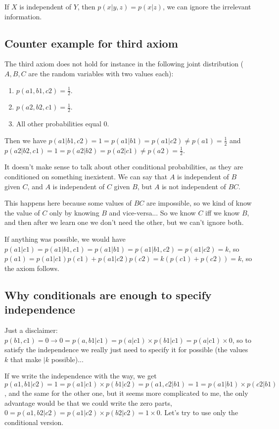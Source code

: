 If $X$ is independent of $Y$, then $p(x|y,z) = p(x|z)$, we can ignore the irrelevant information.

\subsection{Counter example for third axiom}

The third axiom does not hold for instance in the following joint distribution ($A,B,C$ are the random variables with two values each):

\begin{enumerate}
    \item $p(a1,b1,c2) = \frac{1}{2}$.
    \item $p(a2,b2,c1) = \frac{1}{2}$.
    \item All other probabilities equal $0$.
\end{enumerate}

Then we have $p(a1|b1,c2) = 1 = p(a1|b1) = p(a1|c2) \neq p(a1) = \frac{1}{2}$ and $p(a2|b2,c1) = 1 = p(a2|b2) = p(a2|c1) \neq p(a2) = \frac{1}{2}$.

It doesn't make sense to talk about other conditional probabilities, as they are conditioned on something inexistent. We can say that $A$ is independent of $B$ given $C$, and $A$ is independent of $C$ given $B$, but $A$ is not independent of $BC$. 

This happens here because some values of $BC$ are impossible, so we kind of know the value of $C$ only by knowing $B$ and vice-versa... So we know $C$ iff we know $B$, and then after we learn one we don't need the other, but we can't ignore both.

If anything was possible, we would have $p(a1|c1) = p(a1|b1,c1) = p(a1|b1) = p(a1|b1,c2) = p(a1|c2) = k$, so $p(a1) = p(a1|c1)p(c1)+p(a1|c2)p(c2) = k(p(c1)+p(c2))=k$, so the axiom follows.

\subsection{Why conditionals are enough to specify independence}

Just a disclaimer: $p(b1,c1) = 0 \rightarrow 0 = p(a,b1|c1) = p(a|c1) \times p(b1|c1) = p(a|c1) \times 0$, so to satisfy the independence we really just need to specify it for possible  (the values $k$ that make $|k$ possible)...

If we write the independence with the  way, we get $p(a1,b1|c2) = 1 = p(a1|c1) \times p(b1|c2) = p(a1,c2|b1) = 1 = p(a1|b1) \times p(c2|b1)$, and the same for the other one, but it seems more complicated to me, the only advantage would be that we could write the zero parts, $0 = p(a1,b2|c2) = p(a1|c2)\times p(b2|c2) = 1 \times 0$. Let's try to use only the conditional version.


